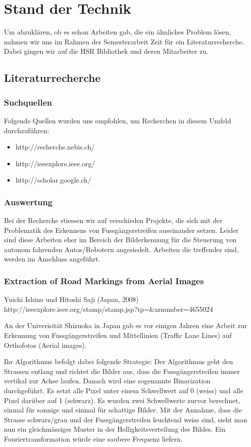 \chapter{Stand der Technik}
Um abzuklären, ob es schon Arbeiten gab, die ein ähnliches Problem lösen, nahmen wir uns im Rahmen der Semesterarbeit Zeit für ein Literaturrecherche. Dabei gingen wir auf die HSR Bibliothek und deren Mitarbeiter zu.
\section{Literaturrecherche}
\subsection{Suchquellen}
Folgende Quellen wurden uns empfohlen, um Recherchen in diesem Umfeld durchzuführen:
\begin{itemize}
	\item http://recherche.nebis.ch/
    \item http://ieeexplore.ieee.org/
    \item http://scholar.google.ch/
\end{itemize}

\subsection{Auswertung}
Bei der Recherche stiessen wir auf verschieden Projekte, die sich mit der Problematik des Erkennens von Fussgängerstreifen auseinander setzen. Leider sind diese Arbeiten eher im Bereich der Bilderkennung für die Steuerung von autonom fahrenden Autos/Robotern angesiedelt. Arbeiten die treffender sind, werden im Anschluss angeführt.
\subsection{Extraction of Road Markings from Aerial Images}
Yuichi Ishino und Hitoshi Saji (Japan, 2008)
http://ieeexplore.ieee.org/stamp/stamp.jsp?tp=\&arnumber=4655024

An der Univerisität Shizuoka in Japan gab es vor einigen Jahren eine Arbeit zur Erkennung von Fussgängerstreifen und Mittellinien (Traffic Lane Lines) auf Orthofotos (Aerial images).

Ihr Algorithmus befolgt dabei folgende Strategie:
Der Algorithmus geht den Strassen entlang und richtet die Bilder aus, dass die Fussgängerstreifen immer vertikal zur Achse laufen. Danach wird eine sogenannte Binarization durchgeführt. Es setzt alle Pixel unter einem Schwellwert auf 0 (weiss) und alle Pixel darüber auf 1 (schwarz). Es wurden zwei Schwellwerte zurvor berechnet, einmal für sonnige und einmal für schattige Bilder.
Mit der Annahme, dass die Strasse schwarz/grau und der Fussgängerstreifen leuchtend weiss sind, sieht man nun ein gleichmässiges Muster in der Helligkeitsverteilung des Bildes. Ein Fouriertransformation würde eine saubere Frequenz liefern.

